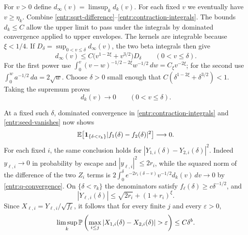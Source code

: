 For \(v>0\) define \(d_\infty(v)=\limsup_k d_k(v)\).
For each fixed \(v\) we eventually have \(v\ge\eta_k\).
Combine \eqref{entr:sqrt-difference}--\eqref{entr:contraction-integrals}.
The bounds \(d_k\le C\) allow the upper limit to pass under the
integrals by dominated convergence applied to upper envelopes.  The
kernels are integrable because \(\xi<1/4\).  If
\(D_\delta=\sup_{0<v\le\delta}d_\infty(v)\), the two beta integrals
then give
\[
 d_\infty(v)
 \le C\bigl(v^{1-2\xi}+v^{3/2}\bigr)D_\delta
 \qquad(0<v\le\delta).
\]
For the first power use
\(\int_0^v(v-w)^{-1/2-2\xi}w^{-1/2}\,dw=C_\xi v^{-2\xi}\);
for the second use
\(\int_0^w a^{-1/2}\,da=2\sqrt w\).
Choose \(\delta>0\) small enough that
\(C(\delta^{1-2\xi}+\delta^{3/2})<1\).  Taking the supremum proves
\begin{equation}\label{entr:q-convergence}
 d_k(v)\longrightarrow0\qquad(0<v\le\delta).
\end{equation}

At a fixed such \(\delta\), dominated convergence in
\eqref{entr:contraction-integrals} and
\eqref{entr:seed-vanishes} now shows
\[
 \mathbb E\!\left[\mathbf 1_{\{\delta<\tau_k\}}
                   |f_1(\delta)-f_2(\delta)|^2\right]\longrightarrow0.
\]
For each fixed \(i\), the same conclusion holds for
\(|Y_{1,i}(\delta)-Y_{2,i}(\delta)|^2\).  Indeed
\(y_{\ell,i}\to0\) in probability by escape and
\(|y_{\ell,i}|^2\le2r_i\), while the squared norm of the difference
of the two \(Z_i\) terms is
\(2\int_0^\delta e^{-2r_i(\delta-v)}v^{-1/2}d_k(v)\,dv\to0\)
by \eqref{entr:q-convergence}.  On \(\{\delta<\tau_k\}\) the
denominators satisfy \(f_\ell(\delta)\ge c\delta^{-1/2}\), and
\[
 |Y_{\ell,i}(\delta)|
 \le\sqrt{2r_i}+(1+r_i)^\xi .
\]
Since \(X_{\ell,i}=Y_{\ell,i}/\sqrt{f_\ell}\), it follows that for
every finite \(j\) and every \(\varepsilon>0\),
\begin{equation}\label{entr:coordinate-coupling}
 \limsup_k\Prob\left(\max_{i\le j}
       |X_{1,i}(\delta)-X_{2,i}(\delta)|>\varepsilon\right)
       \le C\delta^b.
\end{equation}

